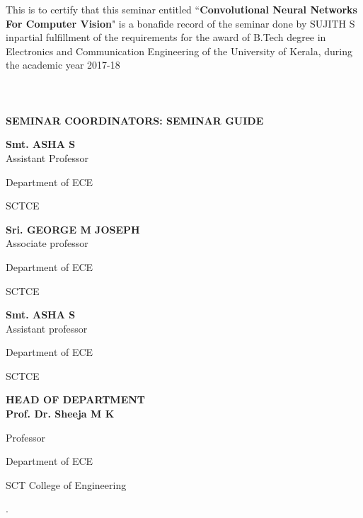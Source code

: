 \documentclass[12pt]{article}
\begin{document}
 \par This is to certify that this seminar entitled “\textbf{Convolutional Neural Networks For Computer Vision}" is a bonafide record of the seminar done by  SUJITH S inpartial fulfillment of the requirements for the award of B.Tech degree in Electronics and Communication Engineering of the University of Kerala,   during the  academic year 2017-18\\
 \\ \\ \\ \textbf{SEMINAR COORDINATORS: \hspace{55mm} SEMINAR GUIDE\\ \vspace{6mm}}

\begin{center}
\begin{multicols}{3}

    
\textbf{\small Smt. ASHA S}
\vspace{2mm}\\Assistant Professor

Department of ECE

SCTCE

\columnbreak %

\textbf{\small Sri. GEORGE M JOSEPH}
\vspace{2mm}\\Associate professor

Department of ECE 

SCTCE


\columnbreak

\textbf{\small Smt. ASHA S}
\vspace{2mm}\\ Assistant professor

Department of ECE

SCTCE

\end{multicols}
\vspace{20mm}

\textbf{\large HEAD OF DEPARTMENT}
\vspace{2mm}\\
\textbf{\small Prof. Dr. Sheeja M K}

Professor

Department of ECE

SCT College of Engineering
\end{center}
\newpage
{}
.
\vspace{25mm}
\end{document}
